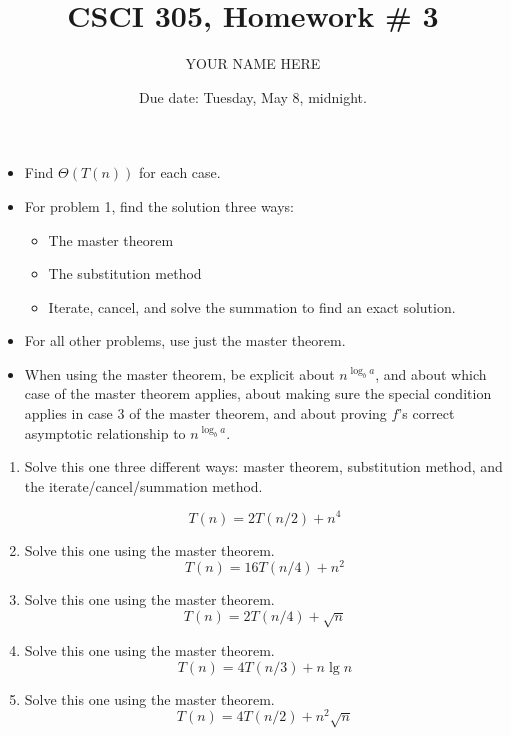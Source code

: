 \documentclass{article}
\title{CSCI 305, Homework \# 3}
\author{YOUR NAME HERE}
\date{Due date:  Tuesday, May 8, midnight.}
\begin{document}
\maketitle

\begin{itemize}
  \item
Find $\Theta(T(n))$ for each case.
\item
For problem 1, find the solution three ways:
\begin{itemize}
\item The master theorem
\item The substitution method
\item Iterate, cancel, and solve the summation
  to find an exact solution.
\end{itemize}
\item
For all other problems, use just the master theorem.
\item
When using the master theorem, be explicit about $n^{\log_b a}$,
and about which case of the master theorem applies,
about making sure the special condition applies in case 3
of the master theorem, and
about proving $f$'s correct
asymptotic relationship to $n^{\log_b a}$.
\end{itemize}

\begin{enumerate}
\item

  Solve this one three different ways:  master theorem,
  substitution method, and the iterate/cancel/summation method.

  \[T(n) = 2T(n/2) + n^4\]


\item Solve this one using the master theorem.
  \[T(n) = 16T(n/4) + n^2\]

  
\item Solve this one using the master theorem.
  \[T(n) = 2T(n/4) + \sqrt{n}\]

\item Solve this one using the master theorem.
  \[T(n) = 4T(n/3) + n\lg n\]

\item Solve this one using the master theorem.
  \[T(n) = 4T(n/2) + n^2\sqrt{n}\]

\end{enumerate}
\end{document}
